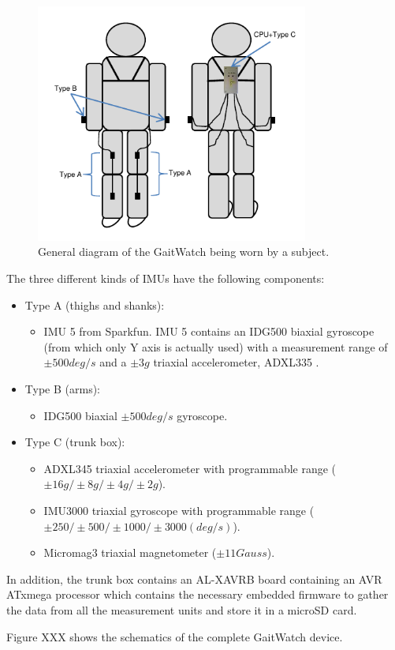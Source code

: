 \begin{figure}[H]
\centering
\includegraphics[width=0.8\textwidth]{figures/GWdiagram}
\caption{General diagram of the GaitWatch being worn by a subject.}
\label{fig:GWdiagram}
\end{figure}

\indent The three different kinds of IMUs have the following components:

\begin{itemize}
	\item Type A (thighs and shanks): 
	\begin{itemize}
		\item IMU 5 \cite{imu5} from Sparkfun. IMU 5 contains an IDG500 \cite{idg500} biaxial gyroscope (from which only Y axis is actually used) with a measurement range of $\pm500deg/s$ and a $\pm3g$ triaxial accelerometer, ADXL335 \cite{adxl335}.
	\end{itemize}
	\item Type B (arms):
	\begin{itemize}
		\item IDG500 \cite{idg500} biaxial $\pm500deg/s$ gyroscope.
	\end{itemize}
	\item Type C (trunk box):
	\begin{itemize}
		\item ADXL345 \cite{adxl345} triaxial accelerometer with programmable range ($\pm16g/\pm8g/\pm4g/\pm2g$).
		\item IMU3000 \cite{imu3000}triaxial gyroscope with programmable range ($\pm250/\pm500/\pm1000/\pm3000 (deg/s)$).
		\item Micromag3 \cite{micromag3} triaxial magnetometer ($\pm11Gauss$).
	\end{itemize}
\end{itemize}

In addition, the trunk box contains an AL-XAVRB \cite{avratx} board containing an AVR ATxmega processor which contains the necessary embedded firmware to gather the data from all the measurement units and store it in a microSD card.

Figure XXX shows the schematics of the complete GaitWatch device.

